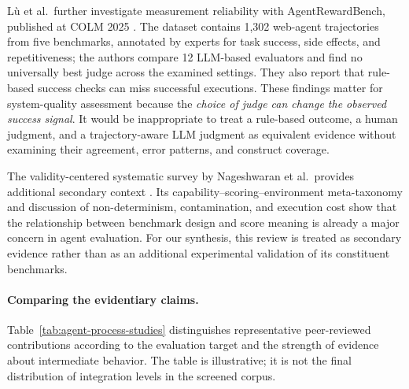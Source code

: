 Lù et al.\ further investigate measurement reliability with AgentRewardBench, published at COLM 2025 \cite{lu2025agentrewardbench}. The dataset contains 1,302 web-agent trajectories from five benchmarks, annotated by experts for task success, side effects, and repetitiveness; the authors compare 12 LLM-based evaluators and find no universally best judge across the examined settings. They also report that rule-based success checks can miss successful executions. These findings matter for system-quality assessment because the \emph{choice of judge can change the observed success signal}. It would be inappropriate to treat a rule-based outcome, a human judgment, and a trajectory-aware LLM judgment as equivalent evidence without examining their agreement, error patterns, and construct coverage.

The validity-centered systematic survey by Nageshwaran et al.\ provides additional secondary context \cite{nageshwaran2026agent}. Its capability--scoring--environment meta-taxonomy and discussion of non-determinism, contamination, and execution cost show that the relationship between benchmark design and score meaning is already a major concern in agent evaluation. For our synthesis, this review is treated as secondary evidence rather than as an additional experimental validation of its constituent benchmarks.

\paragraph{Comparing the evidentiary claims.}
Table~\ref{tab:agent-process-studies} distinguishes representative peer-reviewed contributions according to the evaluation target and the strength of evidence about intermediate behavior. The table is illustrative; it is not the final distribution of integration levels in the screened corpus.

